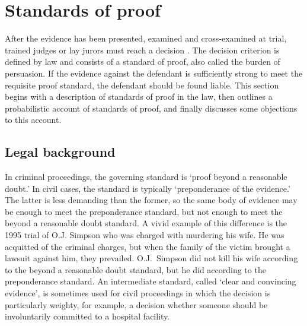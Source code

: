 \documentclass{article}
\begin{document}
\section{Standards of proof}
\label{sec:burden}

After the evidence has been presented, examined and cross-examined at trial,  trained judges or lay jurors must reach a decision \citep[see][for a few caveats on what the decision should be about]{Laudan2010verdicts}.
%
The decision criterion is defined by law 
and consists of a standard of proof, also called the burden of persuasion. 
If the evidence against the defendant is sufficiently strong to meet the requisite proof standard, the defendant should be found liable. This section begins with a description of standards of proof in the law, then outlines a probabilistic account of standards of proof, and finally discusses some objections to this account. 



\subsection{Legal background}
\label{subsec:legal-background}

 
In criminal proceedings, the governing standard is `proof beyond a reasonable doubt.' In civil cases, the standard is typically `preponderance of the evidence.' The latter is less demanding than the former, so the same body of evidence may be enough to meet the preponderance standard, but not enough to meet the beyond a reasonable doubt standard. A vivid example of this difference is the 1995 trial of O.J. Simpson who was charged with murdering his wife. He was acquitted of the criminal charges, but when the family of the victim brought a lawsuit against him, they prevailed. O.J.\ Simpson did not kill his wife according to the beyond a reasonable doubt standard, but he did according to the preponderance standard. An intermediate standard, called `clear and convincing evidence', is sometimes used for civil proceedings in which the decision is particularly weighty, for example, a decision whether someone should be involuntarily committed to a hospital facility. 
\end{document}
